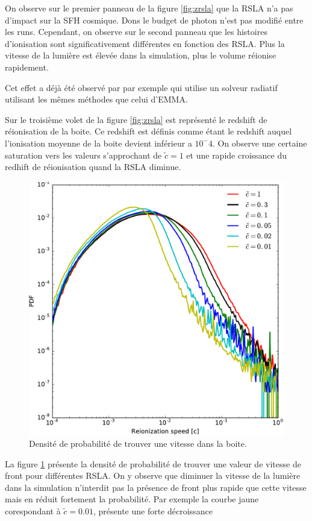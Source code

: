 On observe sur le premier panneau de la figure \ref{fig:zrsla} que la \ac{RSLA} n'a pas d'impact sur la \ac{SFH} cosmique.
Dons le budget de photon n'est pas modifié entre les runs.
Cependant, on observe sur le second panneau que les histoires d'ionisation sont significativement différentes en fonction des \ac{RSLA}.
Plus la vitesse de la lumière est élevée dans la simulation, plus le volume réionise rapidement.

Cet effet a déjà été observé par \cite{rosdahl_ramsesrt_2013} par exemple qui utilise un solveur radiatif utilisant les mêmes méthodes que celui d'EMMA.

Sur le troisième volet de la figure \ref{fig:zrsla} est représenté le redshift de réionisation de la boite.
Ce redshift est définis comme étant le redshift auquel l'ionisation moyenne de la boite devient inférieur a $10^-{4}$.
On observe une certaine saturation vers les valeurs s'approchant de $\tilde{c}=1$ et une rapide croissance du redhift de réionisation quand la \ac{RSLA} diminue.


\begin{figure}
        \includegraphics[width=.95\linewidth]{img/04_mapreio/PDF_v_reio.pdf} 
        \caption[PDF des vitesses de fronts]{Densité de probabilité de trouver une vitesse dans la boite.
		\label{fig:pdfv}}
\end{figure}

La figure \ref{fig:pdfv} présente la densité de probabilité de trouver une valeur de vitesse de front pour différentes \ac{RSLA}.
On y observe que diminuer la vitesse de la lumière dans la simulation n'interdit pas la présence de front plus rapide que cette vitesse mais en réduit fortement la probabilité.
Par exemple la courbe jaune corespondant à $\tilde{c}=0.01$, présente une forte décroissance 


